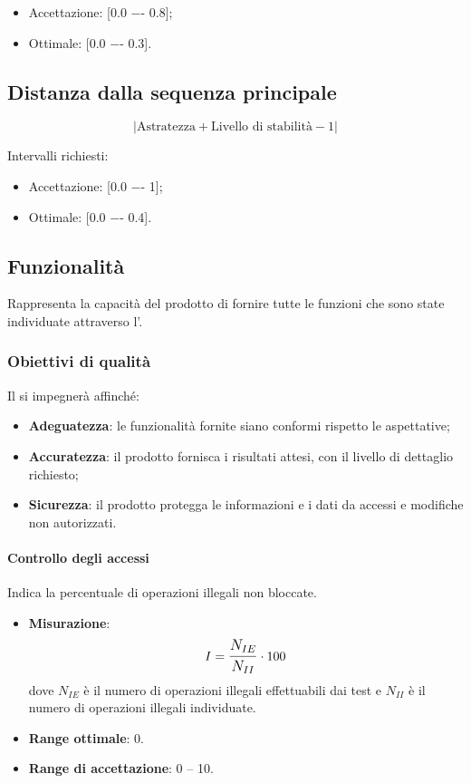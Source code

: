 \begin{itemize}
\item
Accettazione: [0.0 −- 0.8];
\item
Ottimale: [0.0 −- 0.3].
\end{itemize}

\subsection{Distanza dalla sequenza principale}

\begin{displaymath}
{|\text{Astratezza} + \text{Livello di stabilità} - 1|}
\end{displaymath}

Intervalli richiesti:
\begin{itemize}
\item
Accettazione: [0.0 −- 1];
\item
Ottimale: [0.0 −- 0.4].
\end{itemize}


\subsection{Funzionalità}
Rappresenta la capacità del prodotto di fornire tutte le funzioni che sono state individuate attraverso l'\AdR.

\subsubsection{Obiettivi di qualità}
Il  si impegnerà affinché:
\begin{itemize}
\item \textbf{Adeguatezza}: le funzionalità fornite siano conformi rispetto le aspettative;
\item \textbf{Accuratezza}: il prodotto fornisca i risultati attesi, con il livello di dettaglio richiesto;
\item \textbf{Sicurezza}: il prodotto protegga le informazioni e i dati da accessi e modifiche non autorizzati.
\end{itemize}



\paragraph{Controllo degli accessi}
Indica la percentuale di operazioni illegali non bloccate.
\begin{itemize}
	\item \textbf{Misurazione}: 
		$$I=\mathlarger{\frac{N_{IE}}{N_{II}}} \cdot 100$$
	dove $N_{IE}$ è il numero di operazioni illegali effettuabili dai test e $N_{II}$ è il numero di operazioni illegali individuate.
	\item \textbf{Range ottimale}: 0.
	\item \textbf{Range di accettazione}: 0 -- 10.
\end{itemize}


